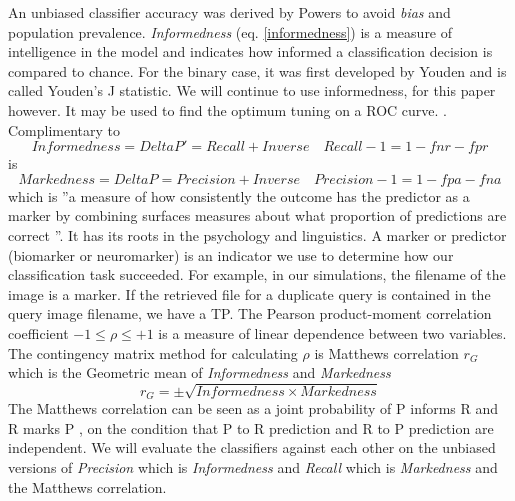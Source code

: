 \documentclass[english,12pt,a4paper,pdftex,elec,utf8, table]{aaltothesis}
\begin{document}
An unbiased classifier accuracy was derived by Powers \cite{Powers2003} to avoid \emph{bias} and population prevalence. \emph{Informedness} (eq. \ref{informedness}) is a measure of intelligence in the model and indicates how informed a classification decision is compared to chance. For the binary case, it was first developed by Youden and is called Youden's J statistic. We will continue to use informedness, for this paper however. It may be used to find the optimum tuning on a ROC curve. \cite{POWERS2011}. Complimentary to
\begin{equation}\label{informedness}
Informedness = DeltaP' = Recall + Inverse\quad Recall - 1 = 1 - fnr - fpr
\end{equation}
is
\begin{equation}\label{markedness}
Markedness = DeltaP = Precision + Inverse\quad Precision - 1 = 1 - fpa - fna
\end{equation}
which is ''a measure of how consistently the outcome has the predictor as a marker by combining surfaces measures about what proportion of predictions are correct \cite{POWERS2011}''.
It has its roots in the psychology and linguistics. A marker or predictor (biomarker or neuromarker) is an indicator we use to determine how our classification task succeeded. For example, in our simulations, the filename of the image is a marker. If the retrieved file for a duplicate query is contained in the query image filename, we have a TP. The Pearson product-moment correlation coefficient $-1 \leq \rho \leq +1$ is a measure of linear dependence between two variables. The contingency matrix method for calculating $\rho$ is Matthews correlation $r_G$ which is the Geometric mean of \emph{Informedness} and \emph{Markedness}
\begin{equation}\label{matthewscorrelation}
r_G = \pm \sqrt{Informedness \times Markedness}
\end{equation}
The Matthews correlation can be seen as a joint probability of P informs R and R marks P \cite{POWERS2011}, on the condition that P to R prediction and R to P prediction are independent.
We will evaluate the classifiers against each other on the unbiased versions of \emph{Precision} which is \emph{Informedness} and \emph{Recall} which is \emph{Markedness} and the Matthews correlation.
\end{document}
